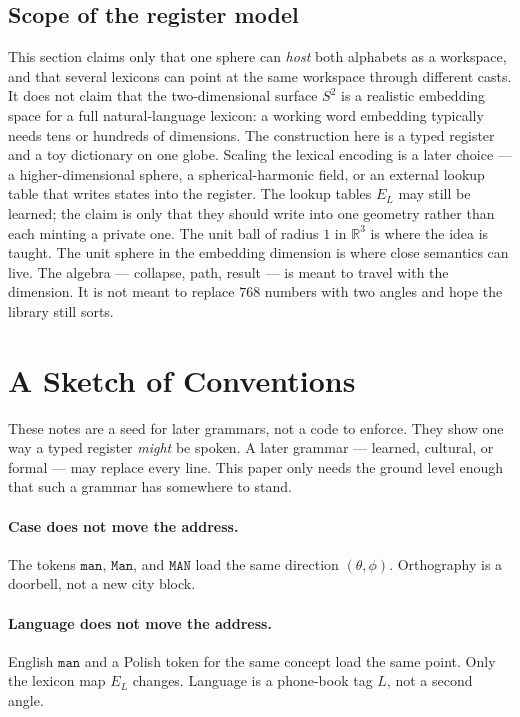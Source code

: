 \documentclass[12pt, a4paper]{article}
\begin{document}
\subsection{Scope of the register model}
\label{subsec:register_scope_final}
This section claims only that one sphere can \emph{host} both alphabets
as a workspace, and that several lexicons can point at the same
workspace through different casts. It does not claim that the two-dimensional surface
$S^2$ is a realistic embedding space for a full natural-language
lexicon: a working word embedding typically needs tens or hundreds of
dimensions. The construction here is a typed register and a toy
dictionary on one globe. Scaling the lexical encoding is a later
choice --- a higher-dimensional sphere, a spherical-harmonic field, or
an external lookup table that writes states into the register. The
lookup tables $E_L$ may still be learned; the claim is only that they
should write into one geometry rather than each minting a private one.
The unit ball of radius $1$ in $\mathbb{R}^3$ is where the idea is
taught. The unit sphere in the embedding dimension is where close
semantics can live. The algebra --- collapse, path, result --- is
meant to travel with the dimension. It is not meant to replace $768$
numbers with two angles and hope the library still sorts.

\section{A Sketch of Conventions}
\label{sec:conventions_sketch}
These notes are a seed for later grammars, not a code to enforce.
They show one way a typed register \emph{might} be spoken. A later
grammar --- learned, cultural, or formal --- may replace every line.
This paper only needs the ground level enough that such a grammar has
somewhere to stand.

\paragraph{Case does not move the address.}
The tokens $\texttt{man}$, $\texttt{Man}$, and $\texttt{MAN}$ load the
same direction $(\theta,\phi)$. Orthography is a doorbell, not a new
city block.

\paragraph{Language does not move the address.}
English $\texttt{man}$ and a Polish token for the same concept load the
same point. Only the lexicon map $E_L$ changes. Language is a
phone-book tag $L$, not a second angle.
\end{document}
